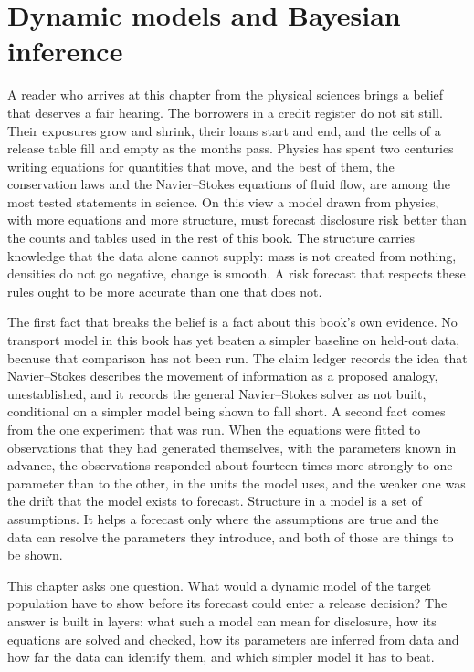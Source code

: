 \chapter{Dynamic models and Bayesian inference}\label{ch:dynamics}

A reader who arrives at this chapter from the physical sciences brings a belief that deserves
a fair hearing. The borrowers in a credit register do not sit still. Their exposures grow
and shrink, their loans start and end, and the cells of a release table fill and empty as the
months pass. Physics has spent two centuries writing equations for quantities that move,
and the best of them, the conservation laws and the Navier--Stokes equations of fluid flow,
are among the most tested statements in science. On this view a model drawn from physics,
with more equations and more structure, must forecast disclosure risk better than the counts
and tables used in the rest of this book. The structure carries knowledge that the data alone
cannot supply: mass is not created from nothing, densities do not go negative, change is
smooth. A risk forecast that respects these rules ought to be more accurate than one that
does not.

The first fact that breaks the belief is a fact about this book's own evidence. No transport model in this book has yet beaten a simpler baseline on held-out data, because that
comparison has not been run. The claim ledger records the idea that Navier--Stokes
describes the movement of information as a proposed analogy, unestablished, and it records
the general Navier--Stokes solver as not built, conditional on a simpler model being shown
to fall short. A second fact comes from the one experiment that was run. When the equations were fitted to observations that they had generated themselves, with the parameters
known in advance, the observations responded about fourteen times more strongly to one
parameter than to the other, in the units the model uses, and the weaker one was the drift
that the model exists to forecast. Structure in a model is a set of assumptions. It helps a
forecast only where the assumptions are true and the data can resolve the parameters they
introduce, and both of those are things to be shown.

This chapter asks one question. What would a dynamic model of the target population
have to show before its forecast could enter a release decision? The answer is built in layers:
what such a model can mean for disclosure, how its equations are solved and checked, how
its parameters are inferred from data and how far the data can identify them, and which
simpler model it has to beat.

